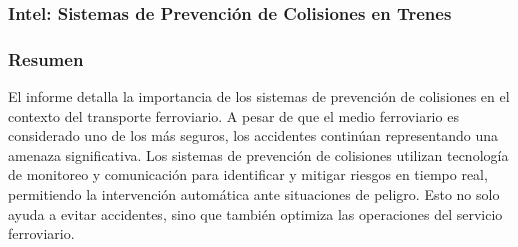 \documentclass[journal]{IEEEtran}
\begin{document}
\subsubsection{Intel: Sistemas de Prevención de Colisiones en Trenes}
\subsubsection*{Resumen}  
El informe detalla la importancia de los sistemas de prevención de colisiones en el contexto del transporte ferroviario. A pesar de que el medio ferroviario es considerado uno de los más seguros, los accidentes continúan representando una amenaza significativa. Los sistemas de prevención de colisiones utilizan tecnología de monitoreo y comunicación para identificar y mitigar riesgos en tiempo real, permitiendo la intervención automática ante situaciones de peligro. Esto no solo ayuda a evitar accidentes, sino que también optimiza las operaciones del servicio ferroviario.
\end{document}
